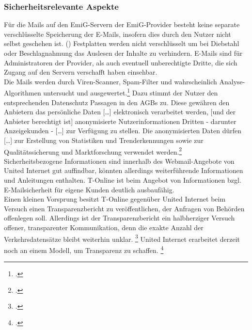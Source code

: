 \documentclass  [paper=a4,
				fontsize=12pt,
				listof=totoc,
				bibliography=totoc
				]{scrreprt}
\begin{document}
		\subsubsection{Sicherheitsrelevante Aspekte}
			Für die Mails auf den \ac{EmiG}-Servern der \ac{EmiG}-Provider besteht keine separate verschlüsselte Speicherung der E-Mails, insofern dies durch den Nutzer nicht selbst geschehen ist. ()
			Festplatten werden nicht verschlüsselt um bei Diebstahl oder Beschlagnahmung das Auslesen der Inhalte zu verhindern.
			E-Mails sind für Administratoren der Provider, als auch eventuell unberechtigte Dritte, die sich Zugang auf den Servern verschafft haben einsehbar.\\
			Die Mails werden durch Viren-Scanner, Spam-Filter und wahrscheinlich Analyse-Algorithmen untersucht und ausgewertet.\footcite[Vgl.][]{Kurz13}
			Dazu stimmt der Nutzer den entsprechenden Datenschutz Passagen in den AGBs zu. Diese gewähren den Anbietern das \glqq [\dots] persönliche Daten [\dots] elektronisch verarbeitet werden, [und der Anbieter berechtigt ist] anonymisierte Nutzerinformationen Dritten - darunter Anzeigekunden - [\dots] zur Verfügung zu stellen. Die anonymisierten Daten dürfen [\dots] zur Erstellung von Statistiken und Trenderkennungen sowie zur Qualitätssicherung und Marktforschung verwendet werden.\grqq \footcite[][]{Web2012}\\
			Sicherheitsbezogene Informationen sind innerhalb des Webmail-Angebote von United Internet gut auffindbar, könnten allerdings weiterführende Informationen und Anleitungen enthalten.
			T-Online ist beim Angebot von Informationen bzgl. E-Mailsicherheit für eigene Kunden deutlich ausbaufähig.\\
			Einen kleinen Vorsprung besitzt T-Online gegenüber United Internet beim Versuch einen Transparenzbericht zu veröffentlichen, der Anfragen von Behörden offenlegen soll.
			Allerdings ist der Transparenzbericht ein halbherziger Versuch offener, transparenter Kommunikation, denn  die exakte Anzahl der Verkehrsdatensätze bleibt weiterhin unklar.
			\footcite[Vgl.][]{Beuth14}
			United Internet erarbeitet derzeit noch an einem Modell, um Transparenz zu schaffen.
			\footcite[Vgl.][]{Boehm14}
\end{document}
